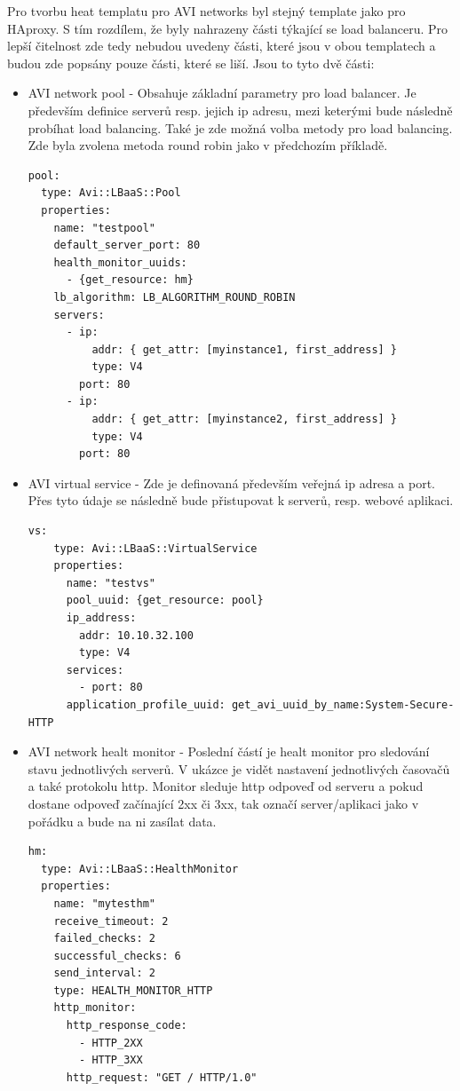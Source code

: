 Pro tvorbu heat templatu pro AVI networks byl stejný template jako pro HAproxy. S tím rozdílem, že byly nahrazeny části týkající se load balanceru. Pro lepší čitelnost zde tedy nebudou uvedeny části, které jsou v obou templatech a budou zde popsány pouze části, které se liší. Jsou to tyto dvě části:

\begin{itemize}
\item AVI network pool - Obsahuje základní parametry pro load balancer. Je především definice serverů resp. jejich ip adresu, mezi keterými bude následně probíhat load balancing. Také je zde možná volba metody pro load balancing. Zde byla zvolena metoda round robin jako v předchozím příkladě. 

\begin{lstlisting}[caption=AVI networks pool]
pool:
  type: Avi::LBaaS::Pool
  properties:
    name: "testpool"
    default_server_port: 80
    health_monitor_uuids:
      - {get_resource: hm}
    lb_algorithm: LB_ALGORITHM_ROUND_ROBIN
    servers:
      - ip:
          addr: { get_attr: [myinstance1, first_address] }
          type: V4
        port: 80
      - ip:
          addr: { get_attr: [myinstance2, first_address] }
          type: V4
        port: 80
\end{lstlisting}

\item AVI virtual service - Zde je definovaná především veřejná ip adresa a port. Přes tyto údaje se následně bude přistupovat k serverů, resp. webové aplikaci.

\begin{lstlisting}[caption=AVI networks healt monitor]
  vs:
    type: Avi::LBaaS::VirtualService
    properties:
      name: "testvs"
      pool_uuid: {get_resource: pool}
      ip_address:
        addr: 10.10.32.100
        type: V4
      services:
        - port: 80
      application_profile_uuid: get_avi_uuid_by_name:System-Secure-HTTP
\end{lstlisting}


\item AVI network healt monitor - Poslední částí je healt monitor pro sledování stavu jednotlivých serverů. V ukázce je vidět nastavení jednotlivých časovačů a také protokolu http. Monitor sleduje http odpoveď od serveru a pokud dostane odpoveď začínající 2xx či 3xx, tak označí server/aplikaci jako v pořádku a bude na ni zasílat data.

\begin{lstlisting}[caption=AVI networks virtual service]
hm:
  type: Avi::LBaaS::HealthMonitor
  properties:
    name: "mytesthm"
    receive_timeout: 2
    failed_checks: 2
    successful_checks: 6
    send_interval: 2
    type: HEALTH_MONITOR_HTTP
    http_monitor:
      http_response_code:
        - HTTP_2XX
        - HTTP_3XX
      http_request: "GET / HTTP/1.0"
\end{lstlisting}

\end{itemize}

